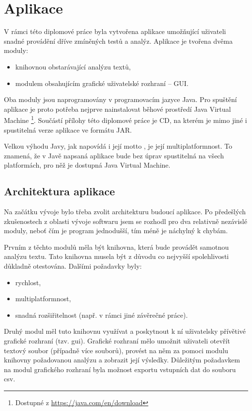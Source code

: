\documentclass[dp.tex]{subfiles}
\begin{document}
\chapter{Aplikace}

V rámci této diplomové práce byla vytvořena aplikace umožňující uživateli snadné provádění dříve zmíněných testů a analýz. Aplikace je tvořena dvěma moduly:
\begin{itemize}
\item knihovnou obstarávající analýzu textů,
\item modulem obsahujícím grafické uživatelské rozhraní -- GUI.
\end{itemize}

Oba moduly jsou naprogramovány v programovacím jazyce Java. Pro spuštění aplikace je proto potřeba nejprve nainstalovat běhové prostředí Java Virtual Machine \footnote{Dostupné z \url {https://java.com/en/download}}. Součástí přílohy této diplomové práce je CD, na kterém je mimo jiné i spustitelná verze aplikace ve formátu JAR.

Velkou výhodu Javy, jak napovídá i její motto , je její multiplatformnost. To znamená, že v Javě napsaná aplikace bude bez úprav spustitelná na všech platformách, pro něž je dostupná Java Virtual Machine. 

\section{Architektura aplikace}

Na začátku vývoje bylo třeba zvolit architekturu budoucí aplikace. Po předešlých zkušenostech z oblasti vývoje softwaru jsem se rozhodl pro dva relativně nezávislé moduly, neboť čím je program jednodušší, tím méně je náchylný k chybám. 

Prvním z těchto modulů měla být knihovna, která bude provádět samotnou analýzu textu. Tato knihovna musela být z důvodu co nejvyšší spolehlivosti důkladně otestována. Dalšími požadavky byly:
\begin{itemize}
\item rychlost,
\item multiplatformnost,
\item snadná rozšiřitelnost (např. v rámci jiné závěrečné práce).
\end{itemize}

Druhý modul měl tuto knihovnu využívat a poskytnout k ní uživatelsky přívětivé grafické rozhraní (tzv. \acrshort{gui}). Grafické rozhraní mělo umožnit uživateli otevřít textový soubor (případně více souborů), provést na něm za pomoci modulu knihovny požadovanou analýzu a zobrazit její výsledky. Důležitým požadavkem na modul grafického rozhraní byla možnost exportu vstupních dat do souboru \acrshort{csv}. 
\end{document}
